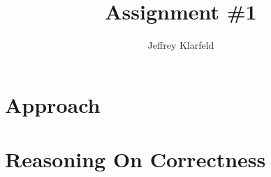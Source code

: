 \documentclass[12pt]{article}
\title{Assignment \#1}
\author{Jeffrey Klarfeld}
\begin{document}
\maketitle

\section{Approach}

\section{Reasoning On Correctness}
\end{document}
